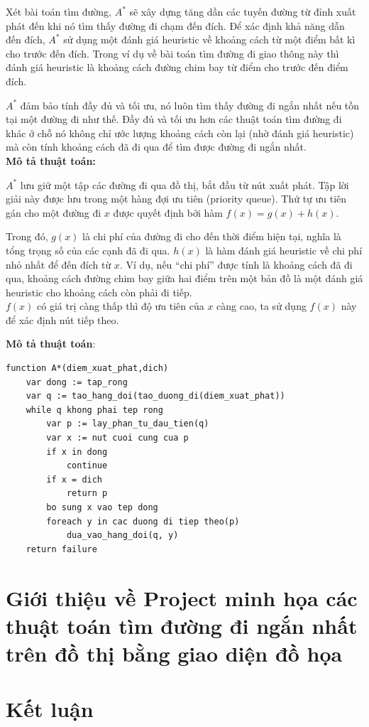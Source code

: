 \documentclass[a4paper,12pt]{report}
\begin{document}
	Xét bài toán tìm đường, $ A^{*} $ sẽ xây dựng tăng dần các tuyến đường từ đỉnh xuất phát đến khi nó tìm thấy đường đi chạm đến đích. Để xác định khả năng dẫn đến đích, $ A^{*} $ sử dụng một đánh giá heuristic về khoảng cách từ một điểm bất kì cho trước đến đích. Trong ví dụ về bài toán tìm đường đi giao thông  này thì đánh giá heuristic là khoảng cách đường chim bay từ điểm cho trước đến điểm đích.
	
	
	$ A^{*} $ đảm bảo tính đầy đủ và tối ưu, nó luôn tìm thấy đường đi ngắn nhất nếu tồn tại một đường đi như thế. Đầy đủ và tối ưu hơn các thuật toán tìm đường đi khác ở chỗ nó không chỉ ước lượng khoảng cách còn lại (nhờ đánh giá heuristic) mà còn tính khoảng cách đã đi qua để tìm được đường đi ngắn nhất.\\
	\textbf{Mô tả thuật toán:}


	$ A^{*} $ lưu giữ một tập các đường đi qua đồ thị, bắt đầu từ nút xuất phát. Tập lời giải này được lưu trong một hàng đợi ưu tiên (priority queue). Thứ tự ưu tiên gán cho một đường đi $x$ được quyết định bởi hàm $ f(x) = g(x) + h(x) $.



	Trong đó, $ g(x) $ là chi phí của đường đi cho đến thời điểm hiện tại, nghĩa là tổng trọng số của các cạnh đã đi qua. $ h(x) $ là hàm đánh giá heuristic về chi phí nhỏ nhất để đến đích từ $x$. Ví dụ, nếu “chi phí” được tính là khoảng cách đã đi qua, khoảng cách đường chim bay giữa hai điểm trên một bản đồ là một đánh giá heuristic cho khoảng cách còn phải đi tiếp.\\

$ f(x) $ có giá trị càng thấp thì độ ưu tiên của $x$ càng cao, ta sử dụng $ f(x) $ này để xác định nút tiếp theo.


	\textbf{Mô tả thuật toán}:

\begin{verbatim}
function A*(diem_xuat_phat,dich)
    var dong := tap_rong
    var q := tao_hang_doi(tao_duong_di(diem_xuat_phat))
    while q khong phai tep rong
        var p := lay_phan_tu_dau_tien(q)
        var x := nut cuoi cung cua p
        if x in dong
            continue
        if x = dich
            return p
        bo sung x vao tep dong
        foreach y in cac duong di tiep theo(p)
            dua_vao_hang_doi(q, y)
    return failure
\end{verbatim}


\chapter{Giới thiệu về Project minh họa các thuật toán tìm đường đi ngắn nhất trên đồ thị bằng giao diện đồ họa}


\chapter{Kết luận}

				
\end{document}
